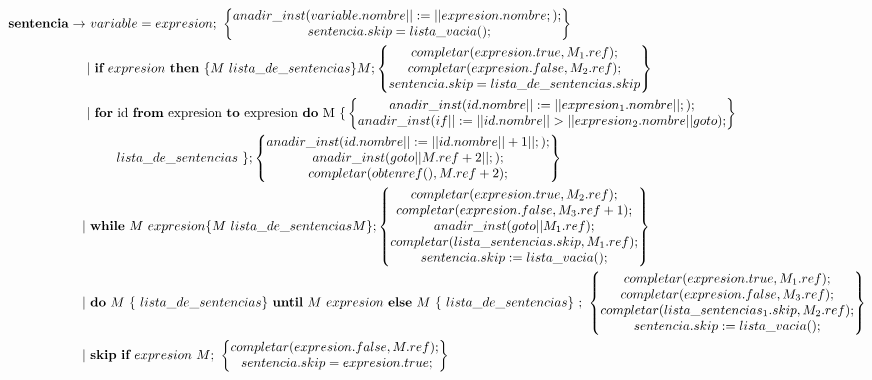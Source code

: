 \documentclass[12pt,a4paper,landscape]{article}
\theoremstyle{mytheor}
\begin{document}
\begin{alignat*}{2}
  \text{\textbf{sentencia}} \to\ & variable = expresion;\ \begin{Bmatrix} anadir\_inst(variable.nombre||:=||expresion.nombre;);\\ sentencia.skip=lista\_vacia();\end{Bmatrix}\\
 |&\ \textbf{if}\ expresion\ \textbf{then}\ \{M\ lista\_de\_sentencias\}M; \begin{Bmatrix} completar(expresion.true,M_1.ref); \\ completar(expresion.false,M_2.ref);\\ sentencia.skip=lista\_de\_sentencias.skip \end{Bmatrix} \\
 |&\text{ \textbf{for} id \textbf{from} expresion \textbf{to} expresion \textbf{do} M \{}\begin{Bmatrix} anadir\_inst(id.nombre||:=||expresion_1.nombre||;);\\ anadir\_inst(if||:=||id.nombre||>||expresion_2.nombre||goto);\end{Bmatrix} \\
     &\ \ \ \ \ \  lista\_de\_sentencias\ \}; \begin{Bmatrix} anadir\_inst(id.nombre||:=||id.nombre|| +1||;);\\ anadir\_inst(goto||M.ref +2||;);\\ completar(obtenref(), M.ref+2);\end{Bmatrix}\\ 
 |\ &\textbf{while}\ M\ expresion \{M\ lista\_de\_sentencias M\}; \begin{Bmatrix} completar(expresion.true,M_2.ref); \\ completar(expresion.false,M_3.ref+1);\\ anadir\_inst(goto||M_1.ref);\\completar(lista\_sentencias.skip,M_1.ref);\\sentencia.skip:=lista\_vacia(); \end{Bmatrix} \\
 |\ &\textbf{do}\ M\ \{\ lista\_de\_sentencias \}\ \textbf{until}\ M\ expresion\ \textbf{else}\ M\ \{\ lista\_de\_sentencias\}\ ;\ \begin{Bmatrix} completar(expresion.true,M_1.ref); \\ completar(expresion.false,M_3.ref);\\ completar(lista\_sentencias_1.skip,M_2.ref);\\sentencia.skip:=lista\_vacia(); \end{Bmatrix} \\
 |\ &\textbf{skip}\ \textbf{if}\ expresion\ M;\ \begin{Bmatrix} completar(expresion.false,M.ref); \\ sentencia.skip =expresion.true; \end{Bmatrix}\\
\end{alignat*}
\end{document}
